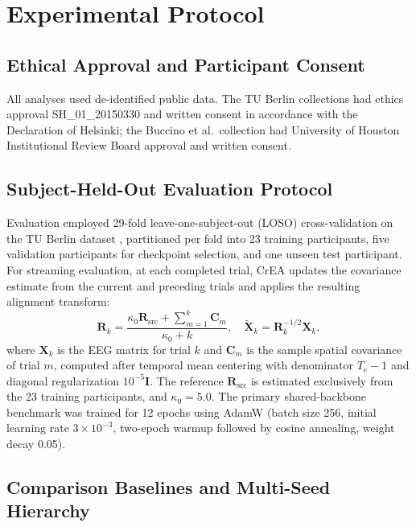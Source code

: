 \documentclass[journal]{IEEEtran}
\begin{document}
\section{Experimental Protocol}
\label{sec:experiments}
\subsection{Ethical Approval and Participant Consent}
All analyses used de-identified public data. The TU Berlin collections \cite{shin2017open, shin2018simultaneous} had ethics approval SH\_01\_20150330 and written consent in accordance with the Declaration of Helsinki; the Buccino et al.\ collection \cite{buccino2016hybrid} had University of Houston Institutional Review Board approval and written consent.

\subsection{Subject-Held-Out Evaluation Protocol}
Evaluation employed 29-fold leave-one-subject-out (LOSO) cross-validation on the TU Berlin dataset \cite{shin2017open}, partitioned per fold into 23 training participants, five validation participants for checkpoint selection, and one unseen test participant. For streaming evaluation, at each completed trial, CrEA updates the covariance estimate from the current and preceding trials and applies the resulting alignment transform:
\begin{equation}
\mathbf{R}_k = \frac{\kappa_0 \mathbf{R}_{\mathrm{src}} + \sum_{m=1}^k \mathbf{C}_m}{\kappa_0 + k}, \quad \widetilde{\mathbf{X}}_k = \mathbf{R}_k^{-1/2} \mathbf{X}_k,
\label{eq:crea}
\end{equation}
where $\mathbf{X}_k$ is the EEG matrix for trial $k$ and $\mathbf{C}_m$ is the sample spatial covariance of trial $m$, computed after temporal mean centering with denominator $T_e-1$ and diagonal regularization $10^{-5}\mathbf{I}$. The reference $\mathbf{R}_{\mathrm{src}}$ is estimated exclusively from the 23 training participants, and $\kappa_0 = 5.0$. The primary shared-backbone benchmark was trained for 12 epochs using AdamW (batch size 256, initial learning rate $3\times10^{-3}$, two-epoch warmup followed by cosine annealing, weight decay 0.05).

\subsection{Comparison Baselines and Multi-Seed Hierarchy}
\end{document}
